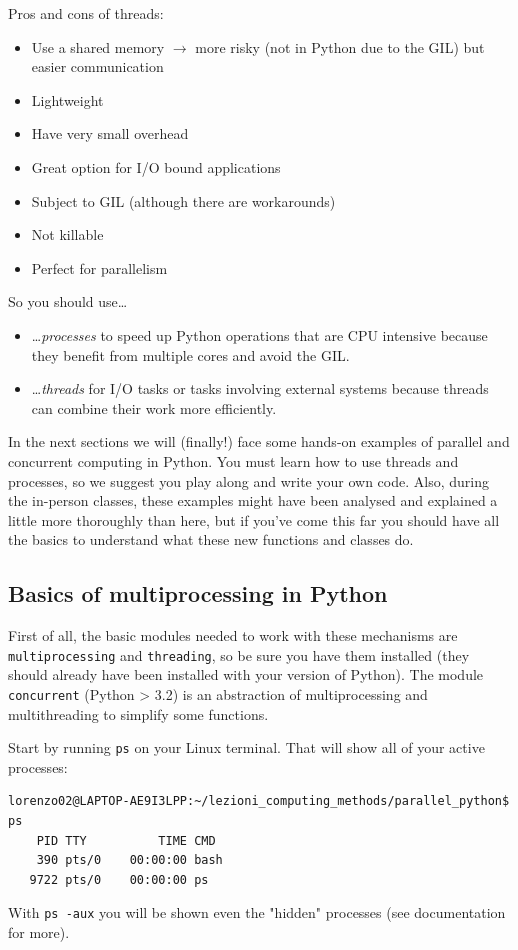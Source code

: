 Pros and cons of threads:
\begin{itemize}
    \item[-] Use a shared memory $\rightarrow$ more risky (not in Python due to the GIL) but easier communication
    \item[-] Lightweight
    \item[-] Have very small overhead
    \item[-] Great option for I/O bound applications
    \item[-] Subject to GIL (although there are workarounds)
    \item[-] Not killable
    \item[-] Perfect for parallelism
\end{itemize}
So you should use\dots
\begin{itemize}
    \item[-] \dots\textit{processes} to speed up Python operations that are CPU intensive because they benefit from multiple cores and avoid the GIL.
    \item[-] \dots\textit{threads} for I/O tasks or tasks involving external systems because threads can combine their work more efficiently.
\end{itemize}

In the next sections we will (finally!) face some hands-on examples of parallel and concurrent computing in Python. You must learn how to use threads and processes, so we suggest you play along and write your own code. Also, during the in-person classes, these examples might have been analysed and explained a little more thoroughly than here, but if you've come this far you should have all the basics to understand what these new functions and classes do.

\subsection{Basics of multiprocessing in Python}

First of all, the basic modules needed to work with these mechanisms are \texttt{multiprocessing} and \texttt{threading}, so be sure you have them installed (they should already have been installed with your version of Python). The module \texttt{concurrent} (Python > 3.2) is an abstraction of multiprocessing and multithreading to simplify some functions.

Start by running \texttt{ps} on your Linux terminal. That will show all of your active processes:
\begin{verbatim}
lorenzo02@LAPTOP-AE9I3LPP:~/lezioni_computing_methods/parallel_python$ ps
    PID TTY          TIME CMD
    390 pts/0    00:00:00 bash
   9722 pts/0    00:00:00 ps
\end{verbatim}
With \texttt{ps -aux} you will be shown even the "hidden" processes (see documentation for more). 


